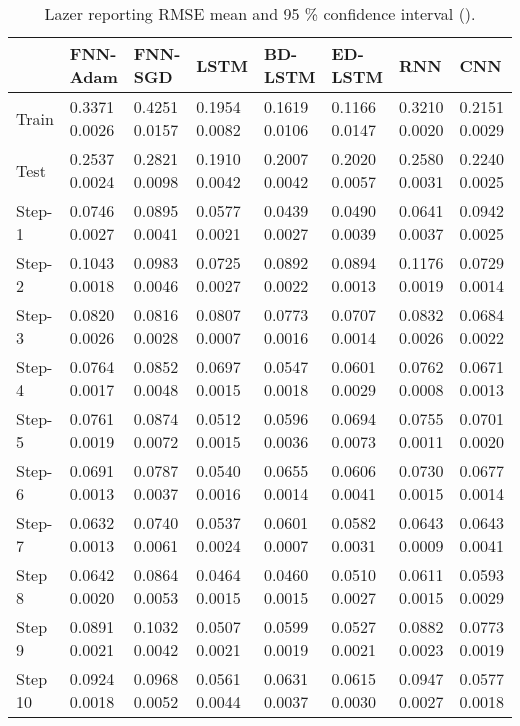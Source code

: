\documentclass[final,5p,times,twocolumn]{elsarticle}
\begin{document}
\begin{table*}[htbp]
 \small 
\begin{tabular}{llllllll}
\hline
 &  FNN-Adam& FNN-SGD & LSTM & BD-LSTM  & ED-LSTM & RNN &CNN\\
\hline
\hline
									
Train &  0.3371   0.0026 & 0.4251    0.0157  & 0.1954    0.0082  & 0.1619   0.0106 &  0.1166   0.0147  &  0.3210   0.0020  & 0.2151	0.0029\\

Test &  0.2537   0.0024 & 0.2821    0.0098  & 0.1910    0.0042  &  0.2007   0.0042 &  0.2020   0.0057  &  0.2580   0.0031  & 0.2240	0.0025\\

Step-1 &  0.0746   0.0027 & 0.0895    0.0041  & 0.0577    0.0021  &  0.0439   0.0027 & 0.0490   0.0039  &  0.0641   0.0037 & 0.0942	0.0025\\

Step-2 &  0.1043   0.0018 & 0.0983    0.0046  & 0.0725  0.0027  &  0.0892   0.0022 &  0.0894   0.0013  & 0.1176   0.0019  & 0.0729	0.0014\\

Step-3 &  0.0820  0.0026 & 0.0816    0.0028  & 0.0807    0.0007  &  0.0773  0.0016 & 0.0707   0.0014  & 0.0832  0.0026 & 0.0684	0.0022\\

Step-4 &  0.0764  0.0017 &0.0852    0.0048  &0.0697    0.0015  &  0.0547  0.0018 &  0.0601   0.0029  & 0.0762   0.0008  &	0.0671	0.0013 \\

Step-5 &  0.0761   0.0019 & 0.0874   0.0072  & 0.0512    0.0015  &  0.0596   0.0036 &  0.0694   0.0073  &  0.0755  0.0011 & 0.0701	0.0020\\

Step-6 &  0.0691   	0.0013 & 0.0787    0.0037  & 0.0540   0.0016 &  0.0655   	0.0014 &  0.0606   0.0041  & 0.0730   0.0015&  0.0677	0.0014 \\

Step-7 &  0.0632   0.0013 & 0.0740    	0.0061  & 0.0537    0.0024  & 0.0601   0.0007 &  0.0582   0.0031  &  0.0643  	0.0009& 	0.0643 	0.0041 \\

Step 8 &  
0.0642	 0.0020 & 
0.0864 	0.0053 & 
0.0464 	0.0015& 
0.0460 	0.0015& 
0.0510 	0.0027& 
0.0611 	0.0015& 0.0593	0.0029\\
Step 9 &  
0.0891	0.0021&
0.1032	0.0042&
0.0507	0.0021&
0.0599	0.0019&
0.0527	0.0021&
0.0882	0.0023& 0.0773	0.0019\\
Step 10 &  
0.0924	0.0018&
0.0968	0.0052&
0.0561	0.0044&
0.0631	0.0037&
0.0615	0.0030&
0.0947	0.0027& 0.0577	0.0018\\
\hline
 
\end{tabular}
\caption{Lazer reporting RMSE mean and 95 \% confidence interval   ().}
\label{tab:lazer}
\end{table*}
\end{document}
